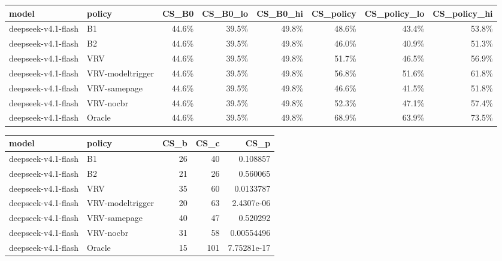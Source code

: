 \begin{tabular}{llrrrrrr}
\toprule
model & policy & CS\_B0 & CS\_B0\_lo & CS\_B0\_hi & CS\_policy & CS\_policy\_lo & CS\_policy\_hi \\
\midrule
deepseek-v4.1-flash & B1 & 44.6\% & 39.5\% & 49.8\% & 48.6\% & 43.4\% & 53.8\% \\
deepseek-v4.1-flash & B2 & 44.6\% & 39.5\% & 49.8\% & 46.0\% & 40.9\% & 51.3\% \\
deepseek-v4.1-flash & VRV & 44.6\% & 39.5\% & 49.8\% & 51.7\% & 46.5\% & 56.9\% \\
deepseek-v4.1-flash & VRV-modeltrigger & 44.6\% & 39.5\% & 49.8\% & 56.8\% & 51.6\% & 61.8\% \\
deepseek-v4.1-flash & VRV-samepage & 44.6\% & 39.5\% & 49.8\% & 46.6\% & 41.5\% & 51.8\% \\
deepseek-v4.1-flash & VRV-nocbr & 44.6\% & 39.5\% & 49.8\% & 52.3\% & 47.1\% & 57.4\% \\
deepseek-v4.1-flash & Oracle & 44.6\% & 39.5\% & 49.8\% & 68.9\% & 63.9\% & 73.5\% \\
\bottomrule
\end{tabular}

\begin{tabular}{llrrr}
\toprule
model & policy & CS\_b & CS\_c & CS\_p \\
\midrule
deepseek-v4.1-flash & B1 & 26 & 40 & 0.108857 \\
deepseek-v4.1-flash & B2 & 21 & 26 & 0.560065 \\
deepseek-v4.1-flash & VRV & 35 & 60 & 0.0133787 \\
deepseek-v4.1-flash & VRV-modeltrigger & 20 & 63 & 2.4307e-06 \\
deepseek-v4.1-flash & VRV-samepage & 40 & 47 & 0.520292 \\
deepseek-v4.1-flash & VRV-nocbr & 31 & 58 & 0.00554496 \\
deepseek-v4.1-flash & Oracle & 15 & 101 & 7.75281e-17 \\
\bottomrule
\end{tabular}
